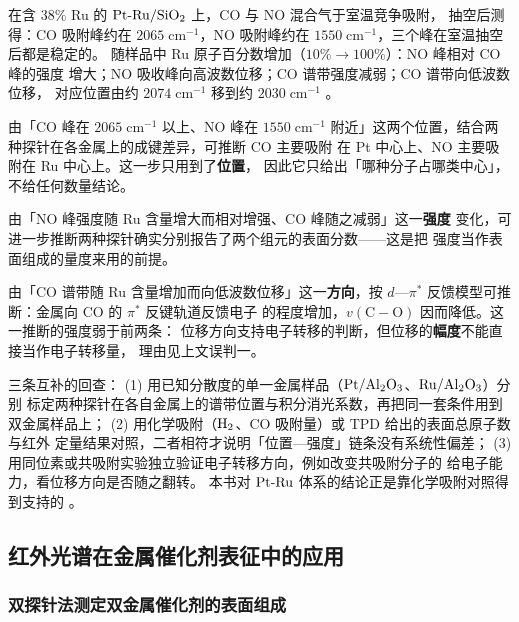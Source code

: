 \begin{obs}
在含 $38\%$ Ru 的 $\ce{Pt{-}Ru/SiO2}$ 上，CO 与 NO 混合气于室温竞争吸附，
抽空后测得：CO 吸附峰约在 $2065\;\mathrm{cm^{-1}}$，NO 吸附峰约在
$1550\;\mathrm{cm^{-1}}$，三个峰在室温抽空后都是稳定的。
随样品中 Ru 原子百分数增加（$10\%\to100\%$）：NO 峰相对 CO 峰的强度
增大；NO 吸收峰向高波数位移；CO 谱带强度减弱；CO 谱带向低波数位移，
对应位置由约 $2074\;\mathrm{cm^{-1}}$ 移到约 $2030\;\mathrm{cm^{-1}}$
。
\end{obs}

\begin{infer}
由「CO 峰在 $2065\;\mathrm{cm^{-1}}$ 以上、NO 峰在 $1550\;\mathrm{cm^{-1}}$
附近」这两个位置，结合两种探针在各金属上的成键差异，可推断 CO 主要吸附
在 Pt 中心上、NO 主要吸附在 Ru 中心上。这一步只用到了\textbf{位置}，
因此它只给出「哪种分子占哪类中心」，不给任何数量结论。

由「NO 峰强度随 Ru 含量增大而相对增强、CO 峰随之减弱」这一\textbf{强度}
变化，可进一步推断两种探针确实分别报告了两个组元的表面分数——这是把
强度当作表面组成的量度来用的前提。

由「CO 谱带随 Ru 含量增加而向低波数位移」这一\textbf{方向}，按
$d$—$\pi^{*}$ 反馈模型可推断：金属向 CO 的 $\pi^{*}$ 反键轨道反馈电子
的程度增加，$v(\mathrm{C{-}O})$ 因而降低。这一推断的强度弱于前两条：
位移方向支持电子转移的判断，但位移的\textbf{幅度}不能直接当作电子转移量，
理由见上文误判一。
\end{infer}

\begin{crosscheck}
三条互补的回查：
(1) 用已知分散度的单一金属样品（$\ce{Pt/Al2O3}$、$\ce{Ru/Al2O3}$）分别
标定两种探针在各自金属上的谱带位置与积分消光系数，再把同一套条件用到
双金属样品上；
(2) 用化学吸附（$\ce{H2}$、CO 吸附量）或 TPD 给出的表面总原子数与红外
定量结果对照，二者相符才说明「位置—强度」链条没有系统性偏差；
(3) 用同位素或共吸附实验独立验证电子转移方向，例如改变共吸附分子的
给电子能力，看位移方向是否随之翻转。
本书对 $\ce{Pt{-}Ru}$ 体系的结论正是靠化学吸附对照得到支持的
。
\end{crosscheck}

\subsection{红外光谱在金属催化剂表征中的应用}

\subsubsection{双探针法测定双金属催化剂的表面组成}

